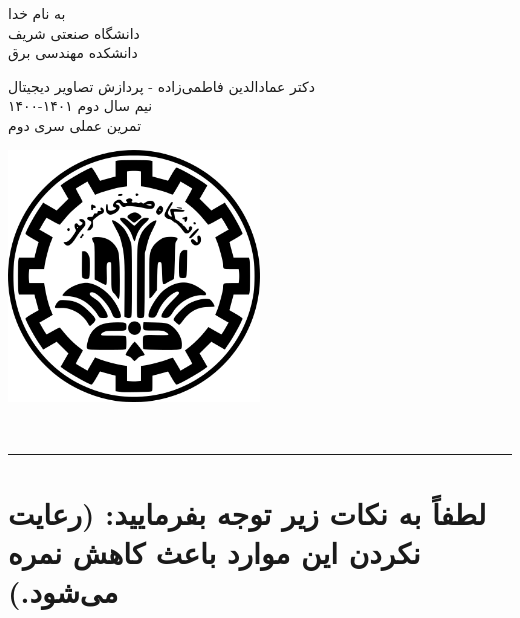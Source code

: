 \documentclass[a4paper]{article}
\begin{document}
\begin{minipage}{0.6\textwidth}
\begin{bf}
\begin{center}
	به نام خدا\\
	\vspace{0.25cm}
	دانشگاه صنعتی شریف\\
	\vspace{0.25cm}
	دانشکده مهندسی برق\\
	\vspace{0.5cm}

\large
دکتر عمادالدین فاطمی‌زاده - پردازش تصاویر دیجیتال \\
نیم سال دوم
۱۴۰۱-۱۴۰۰\\
\Large
\vspace{0.4cm}
تمرین عملی سری دوم\\
\end{center}
\end{bf}
\normalsize
\end{minipage} \hfill
\begin{minipage}{0.35\textwidth}
\begin{flushleft}
\includegraphics[width=0.5\textwidth]{Shariflogo.png}\\ \large
\end{flushleft}

 \end{minipage}
\\

\rule[0.1\baselineskip]{\textwidth}{1pt}

\large
\section*{
لطفاً به نکات زیر توجه بفرمایید: (رعایت نکردن این موارد باعث کاهش نمره می‌شود.)
}
\end{document}
